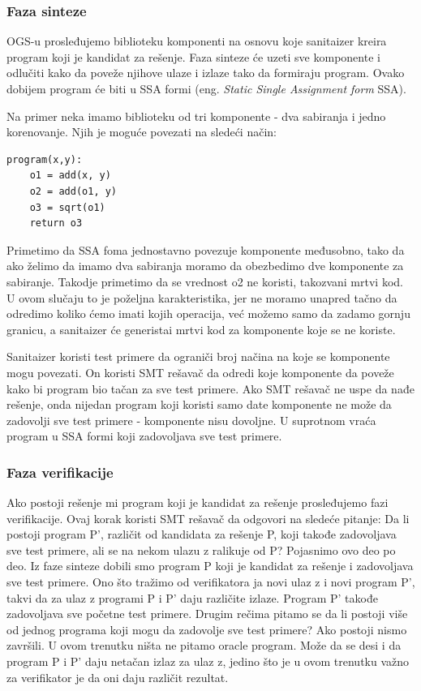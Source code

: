 \subsubsection*{Faza sinteze}
 OGS-u prosleđujemo biblioteku komponenti na osnovu koje sanitaizer kreira program koji je kandidat za rešenje. Faza sinteze će uzeti sve komponente i odlučiti kako da poveže njihove ulaze i izlaze tako da formiraju program. Ovako dobijem program će biti u SSA formi (eng. \emph{Static Single Assignment form} SSA).
 
 Na primer neka imamo biblioteku od tri komponente - dva sabiranja i jedno korenovanje. Njih je moguće povezati na sledeći način:

\begin{lstlisting}
program(x,y):
	o1 = add(x, y)
	o2 = add(o1, y)
	o3 = sqrt(o1)
	return o3
\end{lstlisting}

 
 Primetimo da SSA foma jednostavno povezuje komponente međusobno, tako da ako želimo da imamo dva sabiranja moramo da obezbedimo dve komponente za sabiranje. Takodje primetimo da se vrednost o2 ne koristi, takozvani mrtvi kod. U ovom slučaju to je poželjna karakteristika, jer ne moramo unapred tačno da odredimo koliko ćemo imati kojih operacija, već možemo samo da zadamo gornju granicu, a sanitaizer će generistai mrtvi kod za komponente koje se ne koriste.
 
 Sanitaizer koristi test primere da ograniči broj načina na koje se komponente mogu povezati. On koristi SMT rešavač da odredi koje komponente da poveže kako bi program bio tačan za sve test primere. Ako SMT rešavač ne uspe da nađe rešenje, onda nijedan program koji koristi samo date komponente ne može da zadovolji sve test primere - komponente nisu dovoljne. U suprotnom vraća program u SSA formi koji zadovoljava sve test primere.
 
\subsubsection*{Faza verifikacije}

Ako postoji rešenje mi program koji je kandidat za rešenje prosleđujemo fazi verifikacije. Ovaj korak koristi SMT rešavač da odgovori na sledeće pitanje: Da li postoji program P', različit od kandidata za rešenje P, koji takođe zadovoljava sve test primere, ali se na nekom ulazu z ralikuje od P?
Pojasnimo ovo deo po deo. Iz faze sinteze dobili smo program P koji je kandidat za rešenje i zadovoljava sve test primere. Ono što tražimo od verifikatora ja novi ulaz z i novi program P', takvi da za ulaz z programi P i P' daju različite izlaze. Program P' takođe zadovoljava sve početne test primere.
Drugim rečima pitamo se da li postoji više od jednog programa koji mogu da zadovolje sve test primere? Ako postoji nismo završili.
U ovom trenutku ništa ne pitamo oracle program. Može da se desi i da program P i P' daju netačan izlaz za ulaz z, jedino što je u ovom trenutku važno za verifikator je da oni daju različit rezultat.

